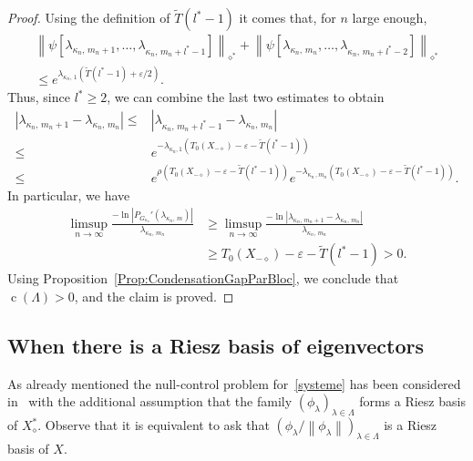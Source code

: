 \documentclass[AHL,Unicode,longabstracts]{cedram}
\newcommand{\Xalphas}{X_\diamond^*}
\newcommand{\Xmalpha}{X_{-\diamond}}
\newcommand{\normeX}[1]{\left\| #1 \right\|}
\newcommand{\normeXalphas}[1]{\left\| #1 \right\|_{\diamond^*}}
\DeclareMathOperator{\cond}{c}
\begin{document}
\begin{proof}
Using the definition of $\widetilde{T}(l^*-1)$ it comes that, for $n$ large enough,
\begin{multline*}
\normeXalphas{ \psi[\lambda_{\kappa_n,\,m_n+1},\dots,\lambda_{\kappa_n,\,m_n+l^*-1}] } + \normeXalphas{ \psi[\lambda_{\kappa_n,\,m_n},\dots,\lambda_{\kappa_n,\,m_n+l^*-2}] } \\
\leq e^{\lambda_{\kappa_n,\,1} \left(\widetilde{T}(l^*-1) + \varepsilon/2\right)}.
\end{multline*}
Thus, since $l^*\geq 2$, we can combine the last two estimates to obtain
\begin{equation*}
\begin{aligned}
\left| \lambda_{\kappa_n,\,m_n+1} - \lambda_{\kappa_n,\,m_n} \right| \leq & \left| \lambda_{\kappa_n,\,m_n+l^*-1} - \lambda_{\kappa_n,\,m_n} \right| \\
\leq & e^{-\lambda_{\kappa_n,1} \left(T_0(\Xmalpha)-\varepsilon - \widetilde{T}(l^*-1)\right)}\\
\leq & e^{\rho\left(T_0(\Xmalpha)-\varepsilon - \widetilde{T}(l^*-1)\right)} e^{-\lambda_{\kappa_n\,,m_n} \left(T_0(\Xmalpha)-\varepsilon - \widetilde{T}(l^*-1)\right)}.
\end{aligned}
\end{equation*}
In particular, we have
\begin{align*}
\limsup_{n \to \infty} \frac{-\ln |P_{G_{\kappa_n}}'(\lambda_{\kappa_n,\,m}) |}{\lambda_{\kappa_n,\,m_n}}& \geq \limsup_{n \to \infty} \frac{-\ln |\lambda_{\kappa_n,\,m_n+1} - \lambda_{\kappa_n,\,m_n}|}{\lambda_{\kappa_n,\,m_n}} \\
& \geq T_0(\Xmalpha)-\varepsilon - \widetilde{T}(l^*-1) > 0.
\end{align*}
Using Proposition~\ref{Prop:CondensationGapParBloc}, we conclude that $\cond(\Lambda)>0$, and the claim is proved.
\end{proof}



\subsection{When there is a Riesz basis of eigenvectors} \label{Subsec:BaseRiesz}


As already mentioned the null-control problem for~\eqref{systeme} has been considered in~\cite{AmmarKhodjaBenabdallahGonzalez-BurgosdeTeresa:2014} with the additional assumption that the family $(\phi_\lambda)_{\lambda\in \Lambda}$ forms a Riesz basis of $\Xalphas$. Observe that it is equivalent to ask that $(\phi_\lambda/\normeX{\phi_\lambda})_{\lambda\in \Lambda}$ is a Riesz basis of $X$.
\end{document}
